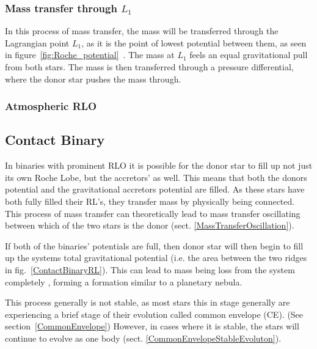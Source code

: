 \documentclass[12pt, a4paper]{article}
\begin{document}
        \subsubsection{Mass transfer through $L_1$} \label{L1MassTransfer}

        In this process of mass transfer, the mass will be transferred through the Lagrangian point $L_1$, as it is the point of lowest potential between them, as seen in figure~\ref{fig:Roche_potential}~\parencite{TaurisvandenHeuvel+2023}. The mass at $L_1$ feels an equal gravitational pull from both stars. The mass is then transferred through a pressure differential, where the donor star pushes the mass through. 

        \subsubsection{Atmospheric RLO} \label{atmosphericRLO}

        \subsection{\centering Contact Binary}
        In binaries with prominent RLO it is possible for the donor star to fill up not just its own Roche Lobe, but the accretors' as well. This means that both the donors  potential and the gravitational accretors potential are filled. \cite{TaurisvandenHeuvel+2023} As these stars have both fully filled their RL's, they transfer mass by physically being connected. This process of mass transfer can theoretically lead to mass transfer oscillating between which of the two stars is the donor (sect. \ref{MassTransferOscillation}). 
        
        If both of the binaries' potentials are full, then donor star will then begin to fill up the systems total gravitational potential (i.e. the area between the two ridges in fig.~\ref{ContactBinaryRL}). This can lead to mass being loss from the system completely \cite{TaurisvandenHeuvel+2023}, forming a formation similar to a planetary nebula.
        
        This process generally is not stable, as most stars this in stage generally are experiencing a brief stage of their evolution called common envelope (CE). (See section~\ref{CommonEnvelope}) However, in cases where it is stable, the stars will continue to evolve as one body (sect. \ref{CommonEnvelopeStableEvoluton}).
        
\end{document}
